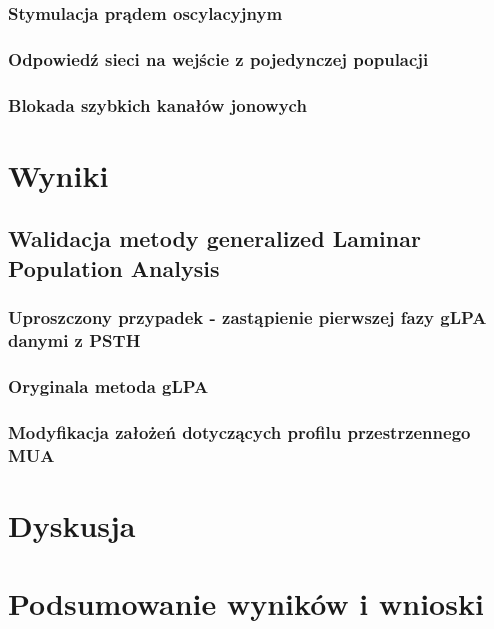 \documentclass[a4paper,12pt,polish]{book}
\begin{document}
\subsection{Stymulacja prądem oscylacyjnym}
\subsection{Odpowiedź sieci na wejście z pojedynczej populacji}
\subsection{Blokada szybkich kanałów jonowych}


\chapter{Wyniki}
\section{Walidacja metody generalized Laminar Population Analysis}
\subsection{Uproszczony przypadek - zastąpienie pierwszej fazy gLPA danymi z PSTH}
\subsection{Oryginala metoda gLPA}
\subsection{Modyfikacja założeń dotyczących profilu przestrzennego MUA}


\chapter{Dyskusja}

\chapter{Podsumowanie wyników i wnioski}






\end{document}
